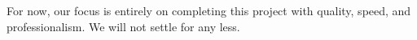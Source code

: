 \documentclass[12pt, titlepage]{article}
\begin{document}
For now, our focus is entirely on completing this project with quality, speed, and professionalism. We will not settle for any less.\\

%
\end{document}
